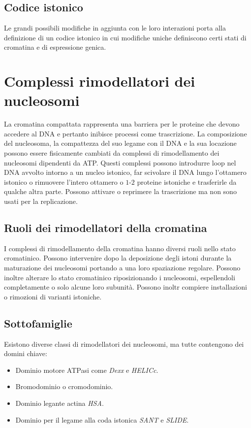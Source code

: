 \subsection{Codice istonico}
Le grandi possibili modifiche in aggiunta con le loro interazioni porta alla definizione di un codice istonico in cui modifiche uniche definiscono certi stati di cromatina e di 
espressione genica. 
\section{Complessi rimodellatori dei nucleosomi}
La cromatina compattata rappresenta una barriera per le proteine che devono accedere al DNA e pertanto inibisce processi come trascrizione. La composizione del nucleosoma, la compattezza
del suo legame con il DNA e la sua locazione possono essere fisicamente cambiati da complessi di rimodellamento dei nucleosomi dipendenti da ATP. Questi complessi possono introdurre
loop nel DNA avvolto intorno a un nucleo istonico, far scivolare il DNA lungo l'ottamero istonico o rimuovere l'intero ottamero o $1$-$2$ proteine istoniche e trasferirle da qualche 
altra parte. Possono attivare o reprimere la trascrizione ma non sono usati per la replicazione.
\subsection{Ruoli dei rimodellatori della cromatina}
I complessi di rimodellamento della cromatina hanno diversi ruoli nello stato cromatinico. Possono intervenire dopo la deposizione degli istoni durante la maturazione dei nucleosomi
portando a una loro spaziazione regolare. Possono inoltre alterare lo stato cromatinico riposizionando i nucleosomi, espellendoli completamente o solo alcune loro subunit\`a. Possono
inoltr compiere installazioni o rimozioni di varianti istoniche. 
\subsection{Sottofamiglie}
Esistono diverse classi di rimodellatori dei nucleosomi, ma tutte contengono dei domini chiave:
\begin{itemize}
	\item Dominio motore ATPasi come \emph{Dexx} e \emph{HELICc}.
	\item Bromodominio o cromodominio.
	\item Dominio legante actina \emph{HSA}.
	\item Dominio per il legame alla coda istonica \emph{SANT} e \emph{SLIDE}.
\end{itemize}
